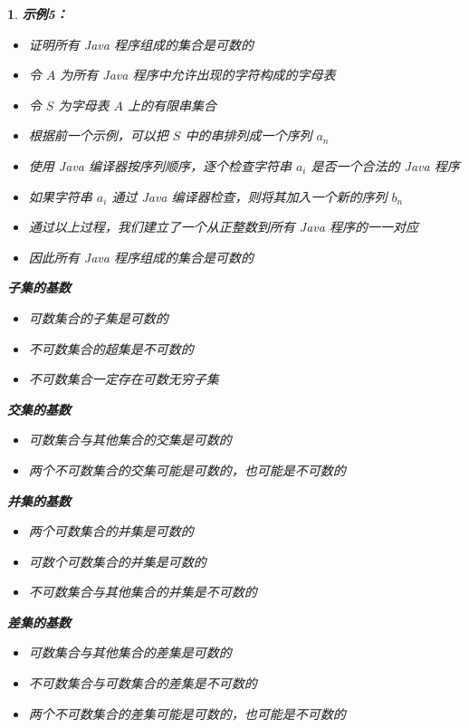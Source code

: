 \documentclass[UTF8]{report}
\theoremstyle{MyLineTheoremStyle} %
\theoremstyle{MyBlockTheoremStyle} %
\theoremstyle{MySubsubsectionStyle} %
\newtheorem{definition}{}
\begin{document}
\begin{definition}
    \textbf{示例5：}\par
    \begin{itemize}
        \item 证明所有 Java 程序组成的集合是可数的
        \item 令 $A$ 为所有 Java 程序中允许出现的字符构成的字母表
        \item 令 $S$ 为字母表 $A$ 上的有限串集合
        \item 根据前一个示例，可以把 $S$ 中的串排列成一个序列 $a_n$
        \item 使用 Java 编译器按序列顺序，逐个检查字符串 $a_i$ 是否一个合法的 Java 程序
        \item 如果字符串 $a_i$ 通过 Java 编译器检查，则将其加入一个新的序列 $b_n$
        \item 通过以上过程，我们建立了一个从正整数到所有 Java 程序的一一对应
        \item 因此所有 Java 程序组成的集合是可数的
    \end{itemize}

    \textbf{子集的基数}\par
    \begin{itemize}
        \item 可数集合的子集是可数的
        \item 不可数集合的超集是不可数的
        \item 不可数集合一定存在可数无穷子集
    \end{itemize}

    \textbf{交集的基数}\par
    \begin{itemize}
        \item 可数集合与其他集合的交集是可数的
        \item 两个不可数集合的交集可能是可数的，也可能是不可数的
    \end{itemize}

    \textbf{并集的基数}\par
    \begin{itemize}
        \item 两个可数集合的并集是可数的
        \item 可数个可数集合的并集是可数的
        \item 不可数集合与其他集合的并集是不可数的
    \end{itemize}

    \textbf{差集的基数}\par
    \begin{itemize}
        \item 可数集合与其他集合的差集是可数的
        \item 不可数集合与可数集合的差集是不可数的
        \item 两个不可数集合的差集可能是可数的，也可能是不可数的
    \end{itemize}
\end{definition}
\end{document}
